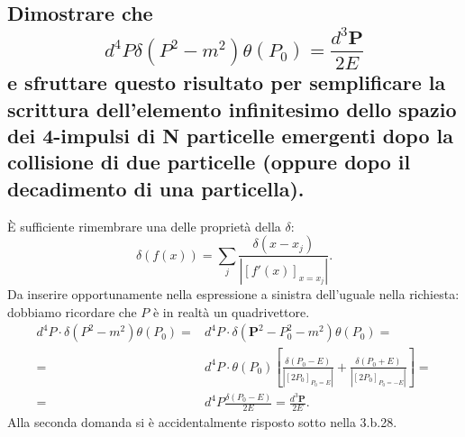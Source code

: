 \subsection[\hspace{2mm} Semplificare l'elemento infinitesimo dello spazio dei 4-impulsi con le proprietà della $\delta$]{Dimostrare che 
\[
d^{4}P \delta\left( P^2-m^2 \right) \theta\left( P_0 \right) = \frac{d^3 \boldsymbol{P} }{2E}
\]
e sfruttare questo risultato per semplificare la scrittura dell’elemento infinitesimo dello spazio dei 4-impulsi di N particelle emergenti dopo la collisione di due particelle (oppure dopo il decadimento di una particella).}
È sufficiente rimembrare una delle proprietà della $\delta$:
\[
	\delta\left( f\left( x \right)  \right) = \sum_{j} \frac{\delta\left( x-x_j \right) }{\left| \left[ f'\left( x \right)  \right]_{x = x_j} \right| }
.\] 
Da inserire opportunamente nella espressione a sinistra dell'uguale nella richiesta: dobbiamo ricordare che $P$ è in realtà un quadrivettore.
\begin{align*}
	d^{4}P \cdot \delta\left( P^2-m^2 \right) \theta\left( P_0 \right) =& d^4P\cdot  \delta\left(\boldsymbol{P}^2 - P_0^2 - m^2 \right) \theta\left( P_0 \right)  = \\
	=& d^4 P \cdot  \theta\left( P_0 \right) \left[ \frac{\delta\left( P_0 - E \right) }{\left| \left[ 2P_0 \right]_{P_0 = E} \right| } + 
		\frac{\delta\left( P_0 + E \right) }{\left| \left[ 2P_0 \right]_{P_0 = -E}  \right| } \right] =\\
		=& d^4P \frac{\delta\left( P_0 - E \right)}{2E} = \frac{d^3 \boldsymbol{P}}{2E}   
.\end{align*}
Alla seconda domanda si è accidentalmente risposto sotto nella 3.b.28.


